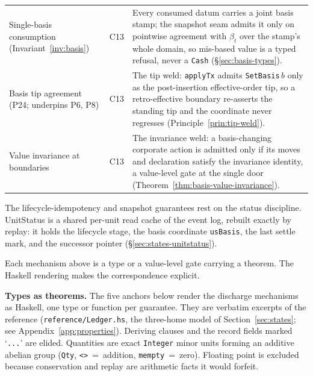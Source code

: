 \begin{center}
\begin{longtable}{@{}p{3.5cm}p{1.6cm}p{6.4cm}@{}}
Single-basis consumption (Invariant~\ref{inv:basis}) & C13 & Every consumed datum carries a joint basis stamp; the snapshot seam admits it only on pointwise agreement with $\beta_t$ over the stamp's whole domain, so mis-based value is a typed refusal, never a \texttt{Cash} (\S\ref{sec:basis-types}). \\
Basis tip agreement (P24; underpins P6, P8) & C13 & The tip weld: \texttt{applyTx} admits \texttt{SetBasis}\,$b$ only as the post-insertion effective-order tip, so a retro-effective boundary re-asserts the standing tip and the coordinate never regresses (Principle~\ref{prin:tip-weld}). \\
Value invariance at boundaries & C13 & The invariance weld: a basis-changing corporate action is admitted only if its moves and declaration satisfy the invariance identity, a value-level gate at the single door (Theorem~\ref{thm:basis-value-invariance}). \\
\bottomrule
\end{longtable}
\end{center}

The lifecycle-idempotency and snapshot guarantees rest on the status discipline. UnitStatus is a shared per-unit read cache of the event log, rebuilt exactly by replay: it holds the lifecycle stage, the basis coordinate \texttt{usBasis}, the last settle mark, and the successor pointer (\S\ref{sec:states-unitstatus}).

Each mechanism above is a type or a value-level gate carrying a theorem. The Haskell rendering makes the correspondence explicit.

\noindent\textbf{Types as theorems.} The five anchors below render the discharge mechanisms as Haskell, one type or function per guarantee. They are verbatim excerpts of the reference (\texttt{reference/Ledger.hs}, the three-home model of Section~\ref{sec:states}; see Appendix~\ref{app:properties}). Deriving clauses and the record fields marked `\texttt{...}' are elided. Quantities are exact \texttt{Integer} minor units forming an additive abelian group (\texttt{Qty}, \texttt{<>}~=~addition, \texttt{mempty}~=~zero). Floating point is excluded because conservation and replay are arithmetic facts it would forfeit.

